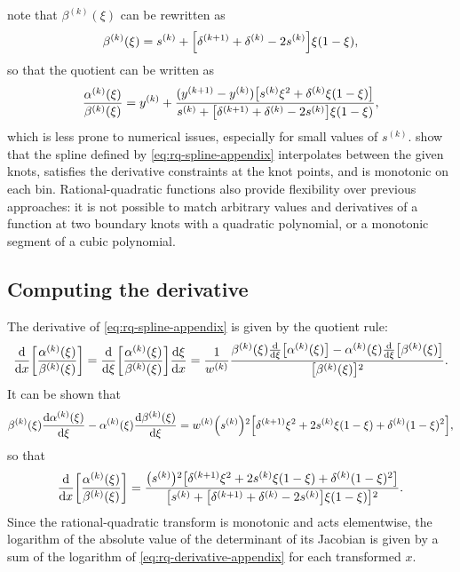 \citet{gregory:1982:rationalquadratic} note that $ \beta^{(k)}(\xi) $ can be rewritten as
\begin{align}
    \beta^{(k)}(\xi) = s^{(k)} + \mathopen{}\left[\delta^{(k + 1)} + \delta^{(k)} - 2 s^{(k)}\right]\mathclose{} \xi (1 - \xi),
\end{align}
so that the quotient can be written as
\begin{align}
    \frac{\alpha^{(k)}(\xi)}{\beta^{(k)}(\xi)} = y^{(k)} + \frac{(y^{(k + 1)} - y^{(k)}) \mathopen{}\left[s^{(k)} \xi^{2} + \delta^{(k)} \xi (1 - \xi)\right]\mathclose{}}{s^{(k)} + \mathopen{}\left[\delta^{(k + 1)} + \delta^{(k)} - 2 s^{(k)}\right]\mathclose{} \xi (1 - \xi)},
    \label{eq:rq-numerical-definition}
\end{align}
which is less prone to numerical issues, especially for small values of $ s^{(k)} $. \citet{gregory:1982:rationalquadratic} show that the spline defined by \cref{eq:rq-spline-appendix} interpolates between the given knots, satisfies the derivative constraints at the knot points, and is monotonic on each bin. 
Rational-quadratic functions also provide flexibility over previous approaches:
it is not possible to match arbitrary values and derivatives of a function at two boundary
knots with a quadratic polynomial, or a monotonic segment of a cubic polynomial.

\subsection{Computing the derivative}
\label{appendix-rq-transform-derivative}
The derivative of \cref{eq:rq-spline-appendix} is given by the quotient rule:
\begin{align}
	\frac{\diff}{\diff x} \squarebr{ \frac{\alpha^{(k)}(\xi)}{\beta^{(k)}(\xi)} } = \frac{\diff}{\diff \xi} \squarebr{ \frac{\alpha^{(k)}(\xi)}{\beta^{(k)}(\xi)} } \frac{\diff \xi}{\diff x} = \frac{1}{w^{(k)}} \frac{\beta^{(k)}(\xi) \frac{\diff }{\diff \xi} \squarebr{\alpha^{(k)}(\xi)} - \alpha^{(k)}(\xi) \frac{\diff}{\diff \xi} \squarebr{\beta^{(k)}(\xi)}}{\squarebr{\beta^{(k)}(\xi)}^{2}}.
\end{align}
It can be shown that
\begin{align}
	 \beta^{(k)}(\xi) \frac{\mathop{}\!\mathrm{d} \alpha^{(k)}(\xi)}{\mathop{}\!\mathrm{d} \xi} - \alpha^{(k)}(\xi) \frac{\mathop{}\!\mathrm{d} \beta^{(k)}(\xi)}{\mathop{}\!\mathrm{d} \xi} = w^{(k)} \mathopen{}\left(s^{(k)}\right)\mathclose{}^{2} \mathopen{}\left[ \delta^{(k + 1)} \xi^{2} + 2 s^{(k)} \xi (1 - \xi) + \delta^{(k)} (1 - \xi)^{2} \right]\mathclose{},
\end{align}
so that 
\begin{align}
	\frac{\mathop{}\!\mathrm{d}}{\mathop{}\!\mathrm{d} x} \mathopen{}\left[ \frac{\alpha^{(k)}(\xi)}{\beta^{(k)}(\xi)} \right]\mathclose{} =  \frac{\mathopen{}\left(s^{(k)}\right)\mathclose{}^{2} \mathopen{}\left[ \delta^{(k + 1)} \xi^{2} + 2 s^{(k)} \xi (1 - \xi) + \delta^{(k)} (1 - \xi)^{2} \right]\mathclose{}}{\mathopen{}\left[s^{(k)} + \mathopen{}\left[\delta^{(k + 1)} + \delta^{(k)} - 2 s^{(k)}\right]\mathclose{} \xi (1 - \xi)\right]\mathclose{}^{2}}.
	\label{eq:rq-derivative-appendix}
\end{align}
Since the rational-quadratic transform is monotonic and acts elementwise, the logarithm of the absolute value of the determinant of its Jacobian is given by a sum of the logarithm of \cref{eq:rq-derivative-appendix} for each transformed $ x $.


